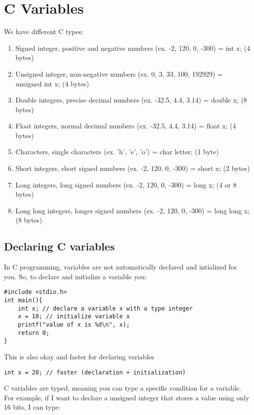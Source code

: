 \documentclass{article}
\begin{document}
\section{C Variables}
We have different C types:

\begin{enumerate}
\item Signed integer, positive and negative numbers (ex. -2, 120, 0, -300) = int x; (4 bytes)
\item Unsigned integer, non-negative numbers (ex. 0, 3, 33, 100, 192929) = unsigned int x; (4 bytes)
\item Double integers, precise decimal numbers (ex. -32.5, 4.4, 3.14) = double x; (8 bytes)
\item Float integers, normal decimal numbers (ex. -32.5, 4.4, 3.14) = float x; (4 bytes)
\item Characters, single characters (ex. 'h', 'e', 'o') = char letter; (1 byte)
\item Short integers, short signed numbers (ex. -2, 120, 0, -300) = short x; (2 bytes)
\item Long integers, long signed numbers (ex. -2, 120, 0, -300) = long x; (4 or 8 bytes)
\item Long long integers, longer signed numbers (ex. -2, 120, 0, -300) = long long x; (8 bytes)
\end{enumerate}


\subsection*{Declaring C variables}
In C programming, variables are not automatically declared and intialized for you. So, to declare and initialize a variable you: 

\begin{verbatim}
#include <stdio.h>
int main(){
	int x; // declare a variable x with a type integer 
	x = 10; // initialize variable x
	printf("value of x is %d\n", x);
	return 0;
}
\end{verbatim}

\noindent This is also okay and faster for declaring variables 

\begin{verbatim}
int x = 20; // faster (declaration + initialization)
\end{verbatim} 

\noindent C variables are typed, meaning you can type a specific condition for a variable. For example, if I want to declare a unsigned integer that stores a
value using only 16 bits, I can type: 
\end{document}
